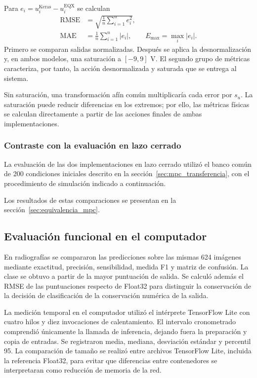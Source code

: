 Para $e_i=u_i^{\mathrm{Keras}}-u_i^{\mathrm{EQX}}$ se calculan
\begin{align}
\mathrm{RMSE}&=\sqrt{\frac{1}{n}\sum_{i=1}^{n}e_i^2},\label{eq:rmse}\\
\mathrm{MAE}&=\frac{1}{n}\sum_{i=1}^{n}|e_i|,\qquad
E_{\max}=\max_i|e_i|.
\end{align}
Primero se comparan salidas normalizadas. Después se aplica la desnormalización y, en ambos modelos, una saturación a $[-9,9]$ V. El segundo grupo de métricas caracteriza, por tanto, la acción desnormalizada y saturada que se entrega al sistema.


Sin saturación, una transformación afín común multiplicaría cada error por $s_u$. La saturación puede reducir diferencias en los extremos; por ello, las métricas físicas se calculan directamente a partir de las acciones finales de ambas implementaciones.
\subsubsection{Contraste con la evaluación en lazo cerrado}
La evaluación de las dos implementaciones en lazo cerrado utilizó el banco común de 200 condiciones iniciales descrito en la sección~\ref{sec:mpc_transferencia}, con el procedimiento de simulación indicado a continuación.


Los resultados de estas comparaciones se presentan en la sección~\ref{sec:equivalencia_mpc}.

\subsection{Evaluación funcional en el computador}

En radiografías se compararon las predicciones sobre las mismas 624 imágenes mediante exactitud, precisión, sensibilidad, medida F1 y matriz de confusión. La clase se obtuvo a partir de la mayor puntuación de salida. Se calculó además el RMSE de las puntuaciones respecto de Float32 para distinguir la conservación de la decisión de clasificación de la conservación numérica de la salida.

La medición temporal en el computador utilizó el intérprete TensorFlow Lite con cuatro hilos y diez invocaciones de calentamiento. El intervalo cronometrado comprendió únicamente la llamada de inferencia, dejando fuera la preparación y copia de entradas. Se registraron media, mediana, desviación estándar y percentil 95. La comparación de tamaño se realizó entre archivos TensorFlow Lite, incluida la referencia Float32, para evitar que diferencias entre contenedores se interpretaran como reducción de memoria de la red.

